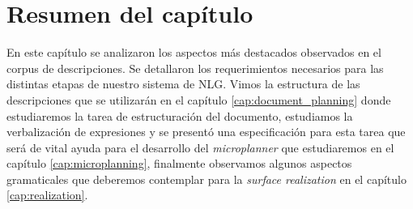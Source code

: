 \section{Resumen del capítulo}
En este capítulo se analizaron los aspectos más destacados observados en el corpus de descripciones. Se detallaron los requerimientos necesarios para las distintas etapas de nuestro sistema de NLG. Vimos la estructura de las descripciones que se utilizarán en el capítulo \ref{cap:document_planning} donde estudiaremos la tarea de estructuración del documento, estudiamos la verbalización de expresiones y se presentó una especificación para esta tarea que será de vital ayuda para el desarrollo del \emph{microplanner} que estudiaremos en el capítulo \ref{cap:microplanning}, finalmente observamos algunos aspectos gramaticales que deberemos contemplar para la \textit{surface realization} en el capítulo \ref{cap:realization}.

